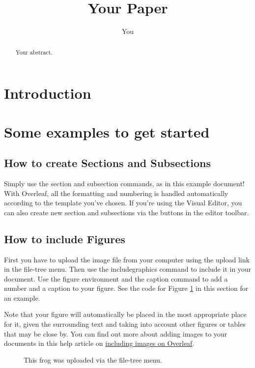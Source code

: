 \documentclass[a4paper]{article}
\title{Your Paper}
\author{You}
\begin{document}
\maketitle

\begin{abstract}
Your abstract.
\end{abstract}

\section{Introduction}


\section{Some examples to get started}

\subsection{How to create Sections and Subsections}

Simply use the section and subsection commands, as in this example document! With Overleaf, all the formatting and numbering is handled automatically according to the template you've chosen. If you're using the Visual Editor, you can also create new section and subsections via the buttons in the editor toolbar.

\subsection{How to include Figures}

First you have to upload the image file from your computer using the upload link in the file-tree menu. Then use the includegraphics command to include it in your document. Use the figure environment and the caption command to add a number and a caption to your figure. See the code for Figure \ref{fig:frog} in this section for an example.

Note that your figure will automatically be placed in the most appropriate place for it, given the surrounding text and taking into account other figures or tables that may be close by. You can find out more about adding images to your documents in this help article on \href{https://www.overleaf.com/learn/how-to/Including_images_on_Overleaf}{including images on Overleaf}.

\begin{figure}
\centering
\caption{\label{fig:frog}This frog was uploaded via the file-tree menu.}
\end{figure}
\end{document}
